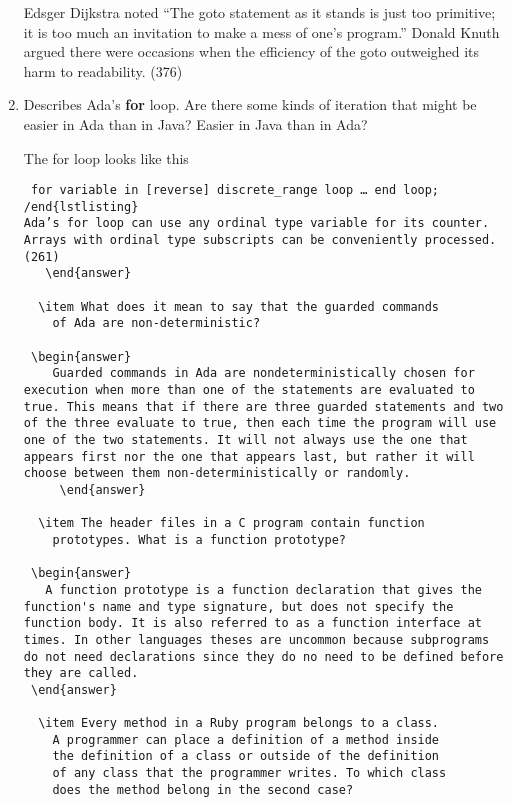 \begin{enumerate}
 \begin{answer}
    Edsger Dijkstra noted “The goto statement as it stands is just too primitive; it is too much an invitation to make a mess of one’s program.” Donald Knuth argued there were occasions when the efficiency of the goto outweighed its harm to readability. (376)
     \end{answer}

  \item Describes Ada's \textbf{for} loop. Are there some
    kinds of iteration that might be easier in Ada than
    in Java? Easier in Java than in Ada?

 \begin{answer}
    The for loop looks like this
\begin{lstlisting} for variable in [reverse] discrete_range loop … end loop; /end{lstlisting}
Ada’s for loop can use any ordinal type variable for its counter. Arrays with ordinal type subscripts can be conveniently processed. (261)
   \end{answer}
   
  \item What does it mean to say that the guarded commands
    of Ada are non-deterministic?

 \begin{answer}
    Guarded commands in Ada are nondeterministically chosen for execution when more than one of the statements are evaluated to true. This means that if there are three guarded statements and two of the three evaluate to true, then each time the program will use one of the two statements. It will not always use the one that appears first nor the one that appears last, but rather it will choose between them non-deterministically or randomly.
     \end{answer}

  \item The header files in a C program contain function
    prototypes. What is a function prototype?

 \begin{answer}
   A function prototype is a function declaration that gives the function's name and type signature, but does not specify the function body. It is also referred to as a function interface at times. In other languages theses are uncommon because subprograms do not need declarations since they do no need to be defined before they are called.
 \end{answer}

  \item Every method in a Ruby program belongs to a class.
    A programmer can place a definition of a method inside
    the definition of a class or outside of the definition
    of any class that the programmer writes. To which class
    does the method belong in the second case?


\end{lstlisting}
\end{answer}
\end{enumerate}
